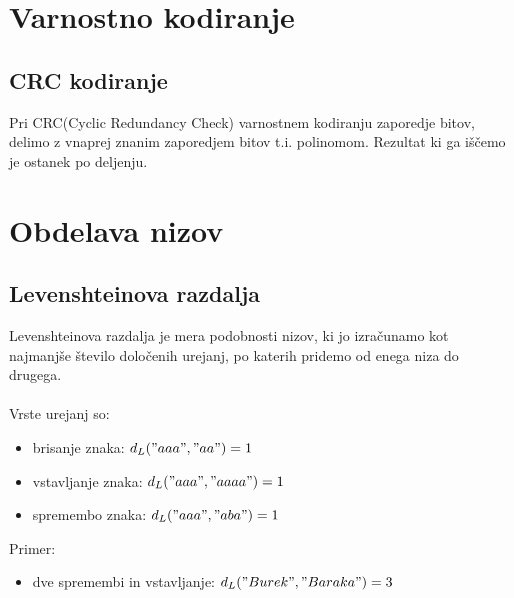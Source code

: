 \documentclass[10pt,a4paper,oneside]{book}
\newenvironment{items}{
\begin{itemize}
  \setlength{\itemsep}{1pt}
  \setlength{\parskip}{0pt}
  \setlength{\parsep}{0pt}
}{\end{itemize}}
\begin{document}
\chapter{Varnostno kodiranje}
%

\section{CRC kodiranje}
Pri CRC(Cyclic Redundancy Check) varnostnem kodiranju zaporedje bitov, delimo z vnaprej znanim zaporedjem bitov t.i. polinomom. Rezultat ki ga iščemo je ostanek po deljenju.



\chapter{Obdelava nizov}
\section{Levenshteinova razdalja}
Levenshteinova razdalja je mera podobnosti nizov, ki jo izračunamo kot najmanjše število določenih urejanj, po katerih pridemo od enega niza do drugega.\\
\ \\
Vrste urejanj so:
\begin{items}
\item brisanje znaka: $d_L("aaa", "aa") = 1$
\item vstavljanje znaka: $d_L("aaa", "aaaa") = 1$
\item spremembo znaka: $d_L("aaa", "aba") = 1$
\end{items}
Primer:
\begin{items}
\item dve spremembi in vstavljanje: $d_L("Burek", "Baraka") = 3$
\end{items}
\end{document}
